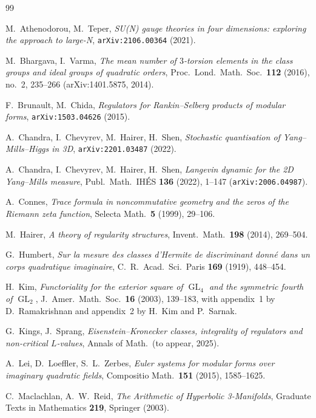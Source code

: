 \documentclass[11pt,a4paper]{article}
\theoremstyle{definition}
\DeclareMathOperator{\GL}{GL}
\begin{document}
\begin{thebibliography}{99}

 M.~Athenodorou, M.~Teper,
\emph{SU(N) gauge theories in four dimensions: exploring the approach
to large-N},
\texttt{arXiv:2106.00364} (2021).

 M.~Bhargava, I.~Varma,
\emph{The mean number of $3$-torsion elements in the class groups and
ideal groups of quadratic orders},
Proc.\ Lond.\ Math.\ Soc.\ \textbf{112} (2016), no.~2, 235--266
(arXiv:1401.5875, 2014).

 F.~Brunault, M.~Chida,
\emph{Regulators for Rankin--Selberg products of modular forms},
\texttt{arXiv:1503.04626} (2015).

 A.~Chandra, I.~Chevyrev, M.~Hairer, H.~Shen,
\emph{Stochastic quantisation of Yang--Mills--Higgs in 3D},
\texttt{arXiv:2201.03487} (2022).

 A.~Chandra, I.~Chevyrev, M.~Hairer, H.~Shen,
\emph{Langevin dynamic for the 2D Yang--Mills measure},
Publ.\ Math.\ IH\'ES \textbf{136} (2022), 1--147
(\texttt{arXiv:2006.04987}).

 A.~Connes,
\emph{Trace formula in noncommutative geometry and the zeros of the
Riemann zeta function},
Selecta Math.\ \textbf{5} (1999), 29--106.

 M.~Hairer,
\emph{A theory of regularity structures},
Invent.\ Math.\ \textbf{198} (2014), 269--504.

 G.~Humbert,
\emph{Sur la mesure des classes d'Hermite de discriminant donn\'e
dans un corps quadratique imaginaire},
C.~R.\ Acad.\ Sci.\ Paris \textbf{169} (1919), 448--454.

 H.~Kim,
\emph{Functoriality for the exterior square of $\GL_{4}$ and the
symmetric fourth of $\GL_{2}$},
J.~Amer.\ Math.\ Soc.\ \textbf{16} (2003), 139--183, with appendix~1
by D.~Ramakrishnan and appendix~2 by H.~Kim and P.~Sarnak.

 G.~Kings, J.~Sprang,
\emph{Eisenstein--Kronecker classes, integrality of regulators and
non-critical $L$-values},
Annals of Math.\ (to appear, 2025).

 A.~Lei, D.~Loeffler, S.~L.~Zerbes,
\emph{Euler systems for modular forms over imaginary quadratic fields},
Compositio Math.\ \textbf{151} (2015), 1585--1625.

 C.~Maclachlan, A.~W.~Reid,
\emph{The Arithmetic of Hyperbolic 3-Manifolds},
Graduate Texts in Mathematics \textbf{219}, Springer (2003).


\end{thebibliography}
\end{document}
